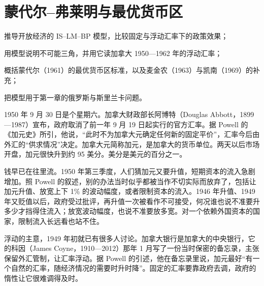 \chapter{蒙代尔–弗莱明与最优货币区}\label{ch:mundell}

\begin{chapterguide}
\begin{guidegoals}
\item 推导开放经济的 IS–LM–BP 模型，比较固定与浮动汇率下的政策效果；
\item 用模型说明不可能三角，并用它读加拿大 1950—1962 年的浮动汇率；
\item 概括蒙代尔（1961）的最优货币区标准，以及麦金农（1963）与凯南（1969）的补充；
\item 把模型用于第一章的俄罗斯与斯里兰卡问题。
\end{guidegoals}
\end{chapterguide}

1950 年 9 月 30 日是个星期六。加拿大财政部长阿博特（Douglas Abbott，1899—1987）宣布，政府取消了前一年 9 月 19 日起实行的官方汇率\cite{powell2005,gnd37}。据 Powell 的《加元史》所引，他说，“此时不为加拿大元确定任何新的固定平价”，汇率今后由外汇的“供求情况”决定\cite{powell2005}。加拿大元简称加元，是加拿大的货币单位。两天以后市场开盘，加元很快升到约 95 美分\cite{powell2005}。美分是美元的百分之一。

钱早已在往里流。1950 年第三季度，人们猜加元又要升值，短期资本的流入急剧增加\cite{powell2005}。照 Powell 的叙述，别的办法当时似乎都被当作不切实际而放弃了，包括让加元升值、放宽上下 1\% 的波动幅度，或者限制资本的流入\cite{powell2005}。1946 年升值、1949 年又贬值以后，政府受过批评，再升值一次被看作不可接受，何况谁也说不准要升多少才挡得住流入；放宽波动幅度，也说不准要放多宽\cite{powell2005}。对一个依赖外国资本的国家，限制流入长远看也站不住\cite{powell2005}。

浮动的主意，1949 年初就已有很多人讨论\cite{powell2005}。加拿大银行是加拿大的中央银行，它的科因（James Coyne，1910—2012）那年 1 月写了一份当时保密的备忘录，主张保留外汇管制，让汇率浮动\cite{powell2005,gnd37}。据 Powell 的引述，他在备忘录里说，加元最好“有一个自然的汇率，随经济情况的需要时升时降”\cite{powell2005}。固定的汇率要靠政府去调，政府的惰性让它很难调得及时\cite{powell2005}。

